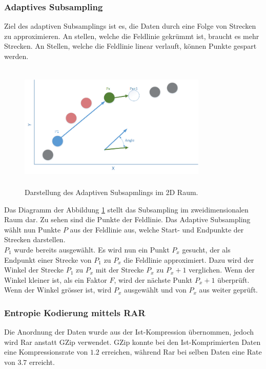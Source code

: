 \subsubsection{Adaptives Subsampling}\label{konzept:loesung0:subsampling}
Ziel des adaptiven Subsamplings ist es, die Daten durch eine Folge von Strecken zu approximieren. An stellen, welche die Feldlinie gekrümmt ist, braucht es mehr Strecken. An Stellen, welche die Feldlinie linear verlauft, können Punkte gespart werden. 
\begin{figure}[!htbp]
	\center
	\includegraphics[width=0.8\textwidth,height=6cm,keepaspectratio]{./pictures/konzept/solution0/anglesubsampling.png}
	\caption{Darstellung des Adaptiven Subsapmlings im 2D Raum.}
	\label{konzept:loesung0:angle}
\end{figure}
Das Diagramm der Abbildung \ref{konzept:loesung0:angle} stellt das Subsampling im zweidimensionalen Raum dar. Zu sehen sind die Punkte der Feldlinie. Das Adaptive Subsampling wählt nun Punkte $P$ aus der Feldlinie aus, welche Start- und Endpunkte der Strecken darstellen.\\
$P_1$ wurde bereits ausgewählt. Es wird nun ein Punkt $P_x$ gesucht, der als Endpunkt einer Strecke von $P_1$ zu $P_x$ die Feldlinie approximiert. Dazu wird der Winkel der Strecke $P_1$ zu $P_x$ mit der Strecke $P_x$ zu $P_x+1$ verglichen. Wenn der Winkel kleiner ist, als ein Faktor $F$, wird der nächste Punkt $P_x+1$ überprüft. Wenn der Winkel grösser ist, wird $P_x$ ausgewählt und von $P_x$ aus weiter geprüft.

\subsubsection{Entropie Kodierung mittels RAR} \label{konzept:loesung0:kodierung}
Die Anordnung der Daten wurde aus der Ist-Kompression übernommen, jedoch wird Rar anstatt GZip verwendet. GZip konnte bei den Ist-Komprimierten Daten eine Kompressionsrate von $1.2$ erreichen, während Rar bei selben Daten eine Rate von $3.7$ erreicht.

